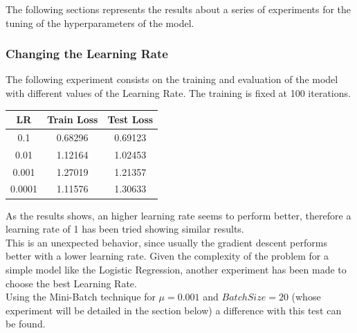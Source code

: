 \documentclass[
	letterpaper, %
	10pt, %
]{class}
\begin{document}
The following sections represents the results about a series of experiments for the tuning of the hyperparameters of the model.

\subsubsection{Changing the Learning Rate}

The following experiment consists on the training and evaluation of the model with different values of the Learning Rate. The training is fixed at 100 iterations.

\begin{center}
    \begin{tabular}{ |c|c|c| }
        \hline
        LR     & Train Loss & Test Loss \\
        \hline
        0.1    & 0.68296    & 0.69123   \\
        0.01   & 1.12164    & 1.02453   \\
        0.001  & 1.27019    & 1.21357   \\
        0.0001 & 1.11576    & 1.30633   \\
        \hline
    \end{tabular}
\end{center}

As the results shows, an higher learning rate seems to perform better, therefore a learning rate of 1 has been tried showing similar results.\\
This is an unexpected behavior, since usually the gradient descent performs better with a lower learning rate. Given the complexity of the problem for a simple model like the Logistic Regression, another experiment has been made to choose the best Learning Rate.\\

Using the Mini-Batch technique for $\mu=0.001$ and $Batch Size = 20$ (whose experiment will be detailed in the section below) a difference with this test can be found.
\end{document}
